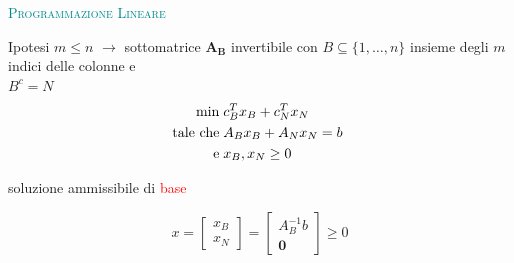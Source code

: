 
\begin{frame}{\textsc{\LARGE \textcolor{darkcyan}{Programmazione Lineare}}}

Ipotesi $m \leq n$ \pause$\longrightarrow$ sottomatrice $\mathbf{A_{B}}$ invertibile \pause
con $B\subseteq\{1,\dots,n\}$ insieme degli $m$ indici delle colonne e\\ $B^{c} = N$
\pause
\begin{equation*}
\begin{split}
\min\;&c_{B}^{T}x_{B}+c_{N}^{T}x_{N}\\
\text{tale che\;}&A_{B}x_{B}+A_{N}x_{N}= b\;\\\text{e\;}&x_{B},x_{N}\geq0
\end{split}
\end{equation*}
\pause
\begin{center}
	soluzione ammissibile di \textcolor{red}{base}
\end{center}
\begin{equation*}
x = \left[\begin{matrix}x_{B}\\x_{N}\end{matrix}\right] = \left[\begin{matrix}A_{B}^{-1}b\\\mathbf{0}\end{matrix}\right]\geq 0
\end{equation*}

\end{frame}


